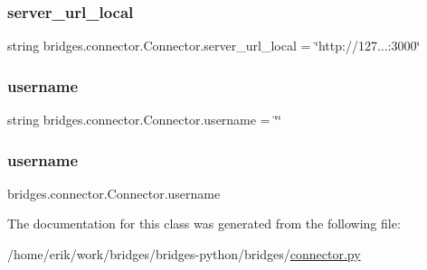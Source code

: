 \subsubsection{\texorpdfstring{server\+\_\+url\+\_\+local}{server\_url\_local}}
{\footnotesize\ttfamily string bridges.\+connector.\+Connector.\+server\+\_\+url\+\_\+local = \char`\"{}http\+://127...\+:3000\char`\"{}\hspace{0.3cm}{\ttfamily [static]}}

\mbox{\label{classbridges_1_1connector_1_1_connector_af2f4f996092cf63a5e7940ca93a2c6b7}} 
\subsubsection{\texorpdfstring{username}{username}\hspace{0.1cm}{\footnotesize\ttfamily [1/2]}}
{\footnotesize\ttfamily string bridges.\+connector.\+Connector.\+username = \char`\"{}\char`\"{}\hspace{0.3cm}{\ttfamily [static]}}

\mbox{\label{classbridges_1_1connector_1_1_connector_adeb8d1b493eae70c24127fb175e1bfe7}} 
\subsubsection{\texorpdfstring{username}{username}\hspace{0.1cm}{\footnotesize\ttfamily [2/2]}}
{\footnotesize\ttfamily bridges.\+connector.\+Connector.\+username}



The documentation for this class was generated from the following file\+:\begin{DoxyCompactItemize}
\item 
/home/erik/work/bridges/bridges-\/python/bridges/\hyperlink{connector_8py}{connector.\+py}\end{DoxyCompactItemize}
